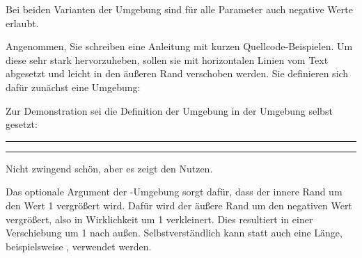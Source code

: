 Bei beiden Varianten der Umgebung sind für alle Parameter auch negative Werte
erlaubt. %
%
\IfThisCommonFirstRun{\iftrue}{\csname iffalse\endcsname}
  \begin{Example}
    Angenommen, Sie schreiben eine Anleitung mit kurzen
    Quellcode-Beispielen. Um diese sehr stark hervorzuheben, sollen sie mit
    horizontalen Linien vom Text abgesetzt und leicht in den äußeren Rand
    verschoben werden. Sie definieren sich dafür zunächst eine Umgebung:
\begin{lstcode}
  \newenvironment{QuellcodeRahmen}{%
    \begin{addmargin*}[1em]{-1em}%
      \begin{minipage}{\linewidth}%
        \rule{\linewidth}{2pt}%
  }{%
      \rule[.25\baselineskip]{\linewidth}{2pt}%
      \end{minipage}%
    \end{addmargin*}%
  }
\end{lstcode}
    \begin{ShowOutput}
      \newenvironment{QuellcodeRahmen}{%
        \begin{addmargin*}[1em]{-1em}%
          \begin{minipage}{\linewidth}%
            \rule{\linewidth}{2pt}%
          }{%
            \rule[.25\baselineskip]{\linewidth}{2pt}%
          \end{minipage}%
        \end{addmargin*}%
      }
      Zur Demonstration sei die Definition der Umgebung in der Umgebung selbst
      gesetzt:
      \begin{QuellcodeRahmen}
\begin{lstcode}
\newenvironment{\QuellcodeRahmen}{%
  \begin{addmargin*}[1em]{-1em}%
    \begin{minipage}{\linewidth}%
      \rule{\linewidth}{2pt}%
}{%
    \rule[.25\baselineskip]{\linewidth}{2pt}%
    \end{minipage}%
  \end{addmargin*}%
}
\end{lstcode}
      \end{QuellcodeRahmen}
      Nicht zwingend schön, aber es zeigt den Nutzen.
    \end{ShowOutput}
    Das optionale Argument der -Umgebung sorgt dafür,
    dass der innere Rand um den Wert 1 vergrößert wird. Dafür wird
    der äußere Rand um den negativen Wert vergrößert, also in Wirklichkeit um
    1 verkleinert. Dies resultiert in einer Verschiebung um
    1 nach außen. Selbstverständlich kann statt \PValue{1em} auch
    eine Länge, beispielsweise , verwendet werden.
  \end{Example}
\fi%

